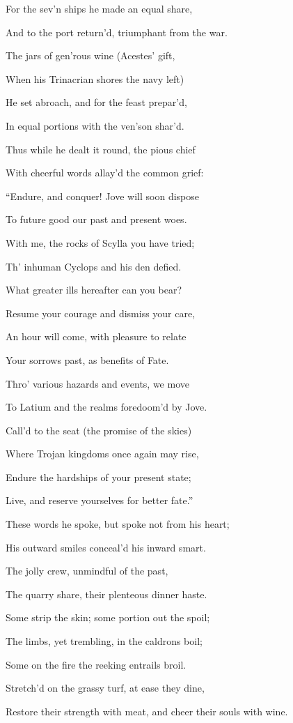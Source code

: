 For the sev’n ships he made an equal share,

And to the port return’d, triumphant from the war.

The jars of gen’rous wine (Acestes’ gift,

When his Trinacrian shores the navy left)

He set abroach, and for the feast prepar’d,

In equal portions with the ven’son shar’d.

Thus while he dealt it round, the pious chief

With cheerful words allay’d the common grief:

“Endure, and conquer! Jove will soon dispose

To future good our past and present woes.

With me, the rocks of Scylla you have tried;

Th’ inhuman Cyclops and his den defied.

What greater ills hereafter can you bear?

Resume your courage and dismiss your care,

An hour will come, with pleasure to relate

Your sorrows past, as benefits of Fate.

Thro’ various hazards and events, we move

To Latium and the realms foredoom’d by Jove.

Call’d to the seat (the promise of the skies)

Where Trojan kingdoms once again may rise,

Endure the hardships of your present state;

Live, and reserve yourselves for better fate.”

These words he spoke, but spoke not from his heart;

His outward smiles conceal’d his inward smart.

The jolly crew, unmindful of the past,

The quarry share, their plenteous dinner haste.

Some strip the skin; some portion out the spoil;

The limbs, yet trembling, in the caldrons boil;

Some on the fire the reeking entrails broil.

Stretch’d on the grassy turf, at ease they dine,

Restore their strength with meat, and cheer their souls with wine.

